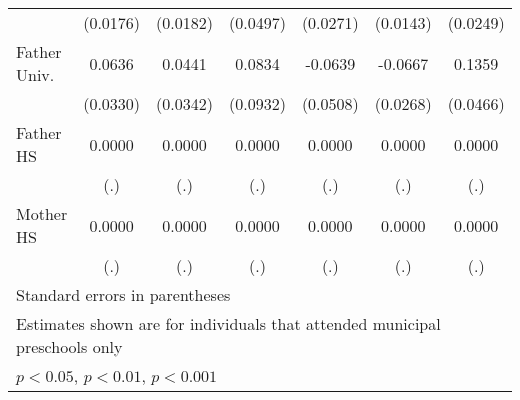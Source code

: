 \begin{table}[htbp]
\begin{tabular}{l*{6}{c}}
            &    (0.0176)         &    (0.0182)         &    (0.0497)         &    (0.0271)         &    (0.0143)         &    (0.0249)         \\
\addlinespace
Father Univ.&      0.0636         &      0.0441         &      0.0834         &     -0.0639         &     -0.0667\sym{*}  &      0.1359\sym{**} \\
            &    (0.0330)         &    (0.0342)         &    (0.0932)         &    (0.0508)         &    (0.0268)         &    (0.0466)         \\
\addlinespace
Father HS   &      0.0000         &      0.0000         &      0.0000         &      0.0000         &      0.0000         &      0.0000         \\
            &         (.)         &         (.)         &         (.)         &         (.)         &         (.)         &         (.)         \\
\addlinespace
Mother HS   &      0.0000         &      0.0000         &      0.0000         &      0.0000         &      0.0000         &      0.0000         \\
            &         (.)         &         (.)         &         (.)         &         (.)         &         (.)         &         (.)         \\
\bottomrule
\multicolumn{7}{l}{\footnotesize Standard errors in parentheses}\\
\multicolumn{7}{l}{\footnotesize Estimates shown are for individuals that attended municipal preschools only}\\
\multicolumn{7}{l}{\footnotesize \sym{*} \(p<0.05\), \sym{**} \(p<0.01\), \sym{***} \(p<0.001\)}\\
\end{tabular}
\end{table}
